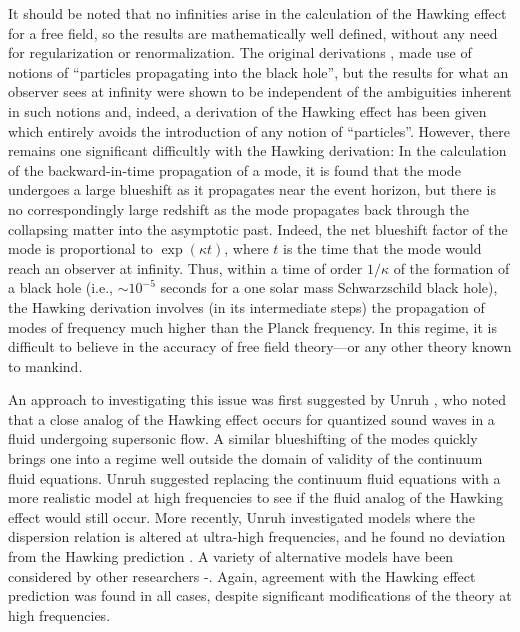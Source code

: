 \documentclass[12pt]{article}
\begin{document}
It should be noted that no infinities arise in the calculation of the
Hawking effect for a free field, so the results are mathematically
well defined, without any need for regularization or
renormalization. The original derivations \cite{h2}, \cite{w7} made
use of notions of ``particles propagating into the black hole'', but
the results for what an observer sees at infinity were shown to be
independent of the ambiguities inherent in such notions and, indeed, a
derivation of the Hawking effect has been given \cite{fh} which
entirely avoids the introduction of any notion of ``particles''.
However, there remains one significant difficultly with the Hawking
derivation: In the calculation of the backward-in-time propagation of
a mode, it is found that the mode undergoes a large blueshift as it
propagates near the event horizon, but there is no correspondingly
large redshift as the mode propagates back through the collapsing
matter into the asymptotic past. Indeed, the net blueshift factor of
the mode is proportional to $\exp(\kappa t)$, where $t$ is the time
that the mode would reach an observer at infinity. Thus, within a time
of order $1/\kappa$ of the formation of a black hole (i.e., $\sim
10^{-5}$ seconds for a one solar mass Schwarzschild black hole), the
Hawking derivation involves (in its intermediate steps) the
propagation of modes of frequency much higher than the Planck
frequency. In this regime, it is difficult to believe in the accuracy
of free field theory---or any other theory known to mankind.

An approach to investigating this issue was first suggested by Unruh
\cite{u2}, who noted that a close analog of the Hawking effect occurs
for quantized sound waves in a fluid undergoing supersonic flow. A
similar blueshifting of the modes quickly brings one into a regime
well outside the domain of validity of the continuum fluid
equations. Unruh suggested replacing the continuum fluid equations
with a more realistic model at high frequencies to see if the fluid
analog of the Hawking effect would still occur. More recently, Unruh
investigated models where the dispersion relation is altered at
ultra-high frequencies, and he found no deviation from the Hawking
prediction \cite{u3}. A variety of alternative models have been
considered by other researchers \cite{bmps}-\cite{jm}. Again,
agreement with the Hawking effect prediction was found in all cases,
despite significant modifications of the theory at high frequencies.
\end{document}

